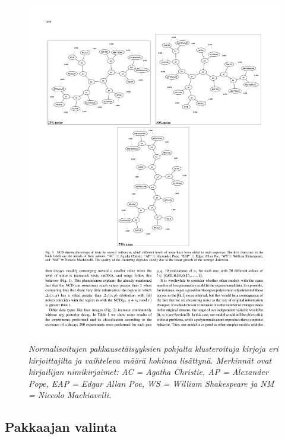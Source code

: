 \documentclass[12pt,finnish]{tktltiki2}
\theoremstyle{definition}
\theoremstyle{remark}
\begin{document}
    \begin{figure}[!htb]
      \includegraphics[width=\textwidth]{img/noise-005}
      \caption{\emph{Normalisoitujen pakkausetäisyyksien pohjalta klusteroituja kirjoja eri kirjoittajilta ja vaihteleva määrä kohinaa lisättynä. Merkinnät ovat kirjailijan nimikirjaimet: AC = Agatha Christie, AP = Alexander Pope, EAP = Edgar Allan Poe, WS = William Shakespeare ja NM = Niccolo Machiavelli.}
      \cite{4167725}}
      \label{fig:(noise-005)}
    \end{figure}


  \subsection{Pakkaajan valinta} %
  \label{sub:pakkaajan_valinta}
\end{document}
